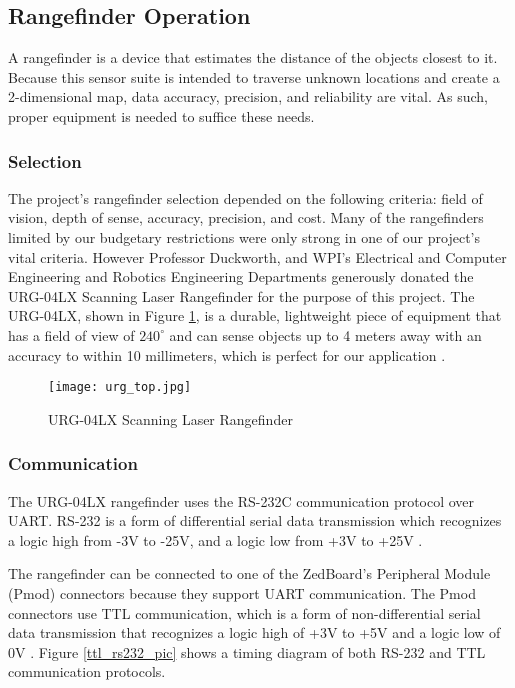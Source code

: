 \subsection{Rangefinder Operation}
A rangefinder is a device that estimates the distance of the objects closest to it. Because this sensor suite is intended to traverse unknown locations and create a 2-dimensional map, data accuracy, precision, and reliability are vital. As such, proper equipment is needed to suffice these needs. 

\subsubsection{Selection}
The project's rangefinder selection depended on the following criteria: field of vision, depth of sense, accuracy, precision, and cost. Many of the rangefinders limited by our budgetary restrictions were only strong in one of our project's vital criteria. However Professor Duckworth, and WPI's Electrical and Computer Engineering and Robotics Engineering Departments generously donated the URG-04LX Scanning Laser Rangefinder for the purpose of this project. The URG-04LX, shown in Figure \ref{rangefinder_pic}, is a durable, lightweight piece of equipment that has a field of view of $240^\circ$ and can sense objects up to 4 meters away with an accuracy to within 10 millimeters, which is perfect for our application \cite{urg04lx_specifications}.

\begin{figure}[H]
	\centerline{\texttt{[image: urg\_top.jpg]}}
	\caption{URG-04LX Scanning Laser Rangefinder \cite{rangefinder_photo}}
	\label{rangefinder_pic}
\end{figure}

\subsubsection{Communication} \label{sssec:rangefinder_communication}
The URG-04LX rangefinder uses the RS-232C communication protocol over UART. RS-232 is a form of differential serial data transmission which recognizes a logic high from -3V to -25V, and a logic low from +3V to +25V \cite{rs232}.
\par
The rangefinder can be connected to one of the ZedBoard's Peripheral Module (Pmod) connectors because they support UART communication. The Pmod connectors use TTL communication, which is a form of non-differential serial data transmission that recognizes a logic high of +3V to +5V and a logic low of 0V \cite{ttl}. Figure \ref{ttl_rs232_pic} shows a timing diagram of both RS-232 and TTL communication protocols.

